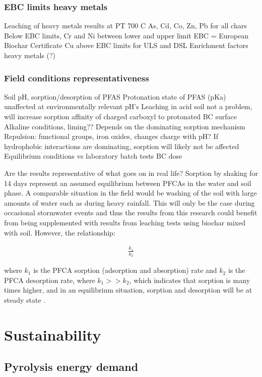\subsubsection{EBC limits heavy metals}
Leaching of heavy metals results at PT 700 C
    As, Cd, Co, Zn, Pb for all chars Below EBC limits, Cr and Ni between lower and upper limit
    EBC = European Biochar Certificate
    Cu above EBC limits for ULS and DSL
    Enrichment factors heavy metals (?)

\subsubsection{Field conditions representativeness}
Soil pH, sorption/desorption of PFAS
Protonation state of PFAS (pKa) unaffected at environmentally relevant pH’s
Leaching in acid soil not a problem, will increase sorption affinity of charged carboxyl to protonated BC surface
Alkaline conditions, liming?? 
    Depends on the dominating sorption mechanism
    Repulsion: functional groups, iron oxides, changes charge with pH?
    If hydrophobic interactions are dominating, sorption will likely not be affected
Equilibrium conditions vs laboratory batch tests
BC dose

Are the results representative of what goes on in real life? Sorption by shaking for 14 days represent an assumed equilibrium between PFCAs in the water and soil phase. A comparable situation in the field would be washing of the soil with large amounts of water such as during heavy rainfall. This will only be the case during occasional stormwater events and thus the results from this research could benefit from being supplemented with results from leaching tests using biochar mixed with soil. However, the relationship:

\begin{align}
    \frac{k_1}{k_2}
\end{align}

where \(k_1\) is the PFCA sorption (adsorption and absorption) rate and \(k_2\) is the PFCA desorption rate, where \(k_1>>k_2\), which indicates that sorption is many times higher, and in an equilibrium situation, sorption and desorption will be at steady state \citep{Cornelissen2005}. 


\section{Sustainability}
\subsection{Pyrolysis energy demand}

